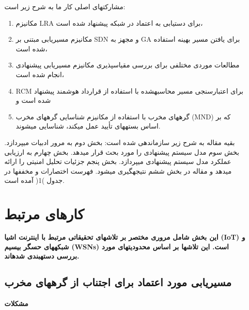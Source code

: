 \documentclass{article} %
\begin{document}
مشارکتهای اصلی کار ما به شرح زیر است:

\begin{enumerate}
\item  مکانیزم LRA برای دستیابی به اعتماد در شبکه پیشنهاد شده است،\textbf{}

\item \textbf{ }مکانیزم مسیریابی مبتنی بر SDN و مجهز به GA برای یافتن مسیر بهینه استفاده شده است،\textbf{}

\item \textbf{ }مطالعات موردی مختلفی برای بررسی مقیاسپذیری مکانیزم مسیریابی پیشنهادی انجام شده است،\textbf{}

\item \textbf{ }RCM برای اعتبارسنجی مسیر محاسبهشده با استفاده از قرارداد هوشمند پیشنهاد شده است و\textbf{}

\item \textbf{ }گرههای مخرب با استفاده از مکانیزم شناسایی گرههای مخرب (MND) که بر اساس بستههای تأیید عمل میکند، شناسایی میشوند.\textbf{}
\end{enumerate}

\noindent بقیه مقاله به شرح زیر سازماندهی شده است: بخش دوم به مرور ادبیات میپردازد. بخش سوم مدل سیستم پیشنهادی را مورد بحث قرار میدهد. بخش چهارم به ارزیابی عملکرد مدل سیستم پیشنهادی میپردازد. بخش پنجم جزئیات تحلیل امنیتی را ارائه میدهد و مقاله در بخش ششم نتیجهگیری میشود. فهرست اختصارات و مخففها در جدول )1( آمده است.


\section{ کارهای مرتبط }

\noindent 
{\bf این بخش شامل مروری مختصر بر تلاشهای تحقیقاتی مرتبط با اینترنت اشیا (IoT) و شبکههای حسگر بیسیم (WSNs) است. این تلاشها بر اساس محدودیتهای مورد بررسی دستهبندی شدهاند.}


\subsection{  مسیریابی مورد اعتماد برای اجتناب از گرههای مخرب}


\paragraph{ مشکلات}
\end{document}
